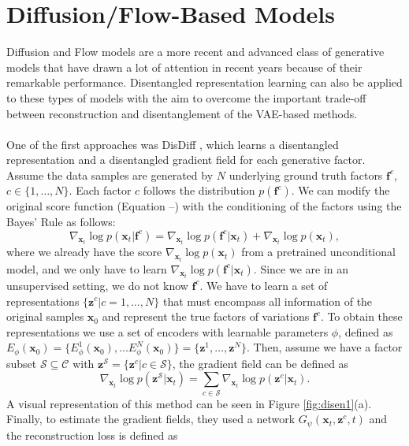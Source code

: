 \section{Diffusion/Flow-Based Models}  
Diffusion and Flow models are a more recent and advanced class of generative models that have drawn a lot of attention in recent years because of their remarkable performance. 
Disentangled representation learning can also be applied to these types of models with the aim to overcome the important trade-off between reconstruction and disentanglement of the VAE-based methods. \\
\\
One of the first approaches was DisDiff \cite{yang2023disdiffunsuperviseddisentanglementdiffusion}, which learns a disentangled representation and a disentangled gradient field 
for each generative factor. Assume the data samples are generated by $N$ underlying ground truth factors $\mathbf{f}^c$, $c\in\{1, \dots, N\}$. Each factor $c$ follows the distribution 
$p(\mathbf{f}^c)$. We can modify the original score function (Equation --) with the conditioning of the factors using the Bayes' Rule as follows: 
\begin{equation}
    \nabla_{\mathbf{x}_t}\log p(\mathbf{x}_t|\mathbf{f}^c) = \nabla_{\mathbf{x}_t}\log p(\mathbf{f}^c|\mathbf{x}_t) + \nabla_{\mathbf{x}_t}\log p(\mathbf{x}_t),
\end{equation}
where we already have the score $\nabla_{\mathbf{x}_t}\log p(\mathbf{x}_t)$ from a pretrained unconditional model, and we only have to learn $\nabla_{\mathbf{x}_t}\log p(\mathbf{f}^c|\mathbf{x}_t)$. 
Since we are in an unsupervised setting, we do not know $\mathbf{f}^c$. We have to learn a set of representations $\{\mathbf{z}^c|c=1,\dots,N\}$ that must encompass all information of the original 
samples $\mathbf{x}_0$ and represent the true factors of variations $\mathbf{f}^c$. To obtain these representations we use a set of encoders with learnable parameters $\phi$, defined 
as $E_{\phi}(\mathbf{x}_0)=\{E_{\phi}^1(\mathbf{x}_0), \dots E_{\phi}^N(\mathbf{x}_0)\}=\{\mathbf{z}^1,\dots,\mathbf{z}^N\}$. Then, assume we have a factor subset $\mathcal{S}\subseteq\mathcal{C}$ 
with $\mathbf{z}^{\mathcal{S}}=\{\mathbf{z}^c|c\in\mathcal{S}\}$, the gradient field can be defined as 
\begin{equation}
    \nabla_{\mathbf{x}_t}\log p(\mathbf{z}^{\mathcal{S}}|\mathbf{x}_t) = \sum_{c\in\mathcal{S}}\nabla_{\mathbf{x}_t}\log p(\mathbf{z}^c|\mathbf{x}_t).
\end{equation}
A visual representation of this method can be seen in Figure \ref{fig:disen1}(a). Finally, to estimate the gradient fields, they used a network $G_{\psi}(\mathbf{x}_t, \mathbf{z}^c, t)$ and the reconstruction loss is defined as 
